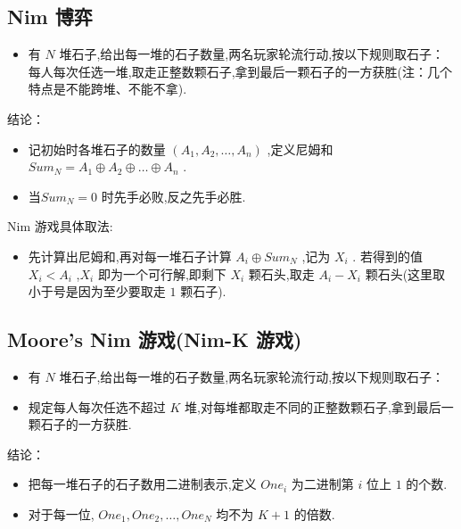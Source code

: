 \subsection{Nim 博弈}
\begin{itemize}
    \item 有 $N$ 堆石子,给出每一堆的石子数量,两名玩家轮流行动,按以下规则取石子：每人每次任选一堆,取走正整数颗石子,拿到最后一颗石子的一方获胜(注：几个特点是不能跨堆、不能不拿).
    
\end{itemize}

结论：
\begin{itemize}
    \item 记初始时各堆石子的数量 $(A_1,A_2,\dots,A_n)$ ,定义尼姆和 $Sum_N = A_1 \oplus A_2 \oplus \dots \oplus A_n$ .
    \item 当$Sum_N = 0$ 时先手必败,反之先手必胜.
\end{itemize}

Nim 游戏具体取法:

\begin{itemize}
    \item 先计算出尼姆和,再对每一堆石子计算 $A_i \oplus Sum_N$ ,记为 $X_i$ .
        若得到的值 $X_i<A_i$ ,$X_i$ 即为一个可行解,即剩下 $X_i$ 颗石头,取走 $A_i - X_i$ 颗石头(这里取小于号是因为至少要取走 $1$ 颗石子).
\end{itemize}


\subsection{Moore’s Nim 游戏(Nim-K 游戏)}
\begin{itemize}
    \item 有 $N$ 堆石子,给出每一堆的石子数量,两名玩家轮流行动,按以下规则取石子：

    \item 规定每人每次任选不超过 $K$ 堆,对每堆都取走不同的正整数颗石子,拿到最后一颗石子的一方获胜.
        
\end{itemize}

结论：
\begin{itemize}
    \item 把每一堆石子的石子数用二进制表示,定义 $One_i$ 为二进制第 $i$ 位上 $1$ 的个数.

    \item 对于每一位, $One_1,One_2,\dots ,One_N$ 均不为 $K+1$ 的倍数.
\end{itemize}

